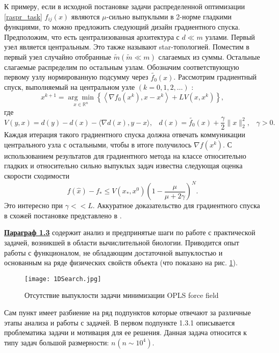   К примеру, если в исходной постановке задачи распределенной оптимизации \eqref{raspr_task} $f_{ij}(x)$ являются $\mu$-сильно выпуклыми в 2-норме гладкими функциями, то можно предложить следующий дизайн градиентного спуска. Предположим, что есть централизованная архитектура с $d \ll m$ узлами. Первый узел является центральным. Это также называют star-топологией. Поместим в первый узел случайно отобранные $\tilde{m}(\widetilde{m} \ll m)$ слагаемых из суммы. Остальные слагаемые распределим по остальным узлам. Обозначим соответствующую первому узлу нормированную подсумму через $\widetilde{f_0}(x)$. Рассмотрим градиентный спуск, выполняемый на центральном узле $(k=0,1,2, \ldots)$ :
  $$
    x^{k+1}=\underset{x \in \mathbb{R}^n}{\arg \min }\left\{\left\langle\nabla f_0\left(x^k\right), x - x^k\right\rangle+L V\left(x, x^k\right)\right\},
  $$
  где
  $$
    V(y, x)=d(y)-d(x)-\langle\nabla d(x), y-x\rangle,\;\;\;d(x)=\widetilde{f_0}(x)+\frac{\gamma}{2}\|x\|_2^2, \;\;\; \gamma>0 .
  $$
  Каждая итерация такого градиентного спуска должна отвечать коммуникации центрального узла с остальными, чтобы в итоге получилось $\nabla f\left(x^k\right)$.
  С использованием результатов для градиентного метода на классе относительно гладких и относительно сильно выпуклых задач известна следующая оценка скорости сходимости
  $$
    f(\hat{x})-f_* \leqslant V\left(x_*, x^0\right)\left(1-\frac{\mu}{\mu+2 \gamma}\right)^N.
  $$
  Это интересно при $\gamma << L$. Аккуратное доказательство для градиентного спуска в схожей постановке представлено в \cite{distrib_relative}.

\underline{\textbf{Параграф 1.3}} содержит анализ и предпринятые шаги по работе с практической задачей, возникшей в области вычислительной биологии. Приводится опыт работы с функционалом, не обладающим достаточной выпуклостью и основанным на ряде физических свойств объекта (что показано на рис. \ref{fig1D}). 

\begin{figure}
\begin{center}
    \texttt{[image: 1DSearch.jpg]}
\end{center}
\caption{Отсутствие выпуклости задачи минимизации OPLS force field}
\label{fig1D}
\end{figure}
     
Сам пункт имеет разбиение на ряд подпунктов которые отвечают за различные этапы анализа и работы с задачей. В первом подпункте 1.3.1 описывается проблематика задачи и мотивация для ее решения. Данная задача относится к типу задач большой размерности:  $n_{ }\left(n\sim 10^4\right)$. 

